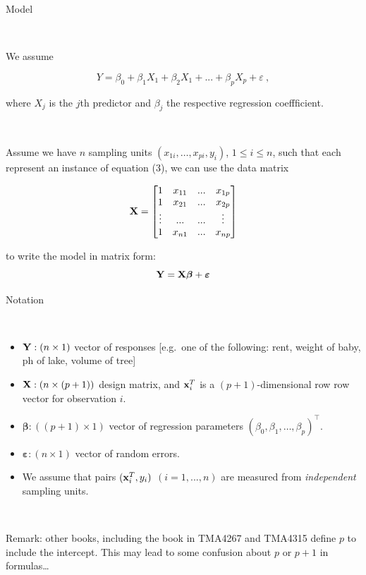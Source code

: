 \documentclass[10pt,ignorenonframetext,]{beamer}
\begin{document}
\begin{frame}

\begin{block}{Model}

\(~\)

We assume

\begin{equation}
Y = \beta_0 + \beta_{1}  X_1 + \beta_2 X_1 + ... + \beta_p X_p + \varepsilon \ ,
\end{equation}

where \(X_j\) is the \(j\)th predictor and \(\beta_j\) the respective
regression coeffficient.

\(~\)

Assume we have \(n\) sampling units \((x_{1i},\ldots,x_{pi}, y_i)\),
\(1\leq i \leq n\), such that each represent an instance of equation
(3), we can use the data matrix

\[{\bf{X}} = \left[\begin{matrix} 1 & x_{11} & ... & x_{1p} \\
1 & x_{21} & ... & x_{2p} \\
\vdots  & ... & ... & \vdots \\
1 & x_{n1} & ... & x_{np} \\
\end{matrix}\right]\]

to write the model in matrix form:
\[{\bf Y}={\bf {X}} \boldsymbol{\beta}+{\boldsymbol{\varepsilon}} \]

\end{block}

\end{frame}

\begin{frame}

\begin{block}{Notation}

\(~\)

\begin{itemize}
\item
  \({\bf Y}: (n \times 1)\) vector of responses {[}e.g.~one of the
  following: rent, weight of baby, ph of lake, volume of tree{]}
\item
  \({\bf X}: (n \times (p+1))\) design matrix, and \({\bf x}_i^T\) is a
  \((p+1)\)-dimensional row row vector for observation \(i\).
\item
  \({\boldsymbol \beta}: ((p+1) \times 1)\) vector of regression
  parameters \((\beta_0,\beta_1,\ldots,\beta_p)^\top\).
\item
  \({\boldsymbol \varepsilon}: (n\times 1)\) vector of random errors.
\item
  We assume that pairs \(({\bf x}_i^T,y_i)\) \((i=1,...,n)\) are
  measured from \emph{independent} sampling units.
\end{itemize}

\(~\)

Remark: other books, including the book in TMA4267 and TMA4315 define
\(p\) to include the intercept. This may lead to some confusion about
\(p\) or \(p+1\) in formulas\ldots{}

\end{block}

\end{frame}
\end{document}
